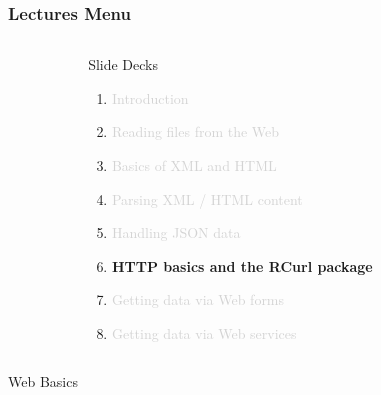 \documentclass{beamer}\usepackage[]{graphicx}\usepackage[]{color}
\begin{document}
\begin{frame}
\frametitle{Lectures Menu}

\begin{columns}[t]
\begin{column}{0.1\textwidth}
\end{column}
\begin{column}{0.8\textwidth}
 \begin{block}{Slide Decks}
  \begin{enumerate}
   \item \textcolor{lightgray}{Introduction}
   \item \textcolor{lightgray}{Reading files from the Web}
   \item \textcolor{lightgray}{Basics of XML and HTML}
   \item \textcolor{lightgray}{Parsing XML / HTML content}
   \item \textcolor{lightgray}{Handling JSON data}
   \item \textbf{HTTP basics and the RCurl package}
   \item \textcolor{lightgray}{Getting data via Web forms}
   \item \textcolor{lightgray}{Getting data via Web services}
  \end{enumerate}
 \end{block}
\end{column}
\begin{column}{0.1\textwidth}
\end{column}
\end{columns}

\end{frame}


\begin{frame}
 \begin{center}
  \Huge{\textcolor{mandarina}{Web Basics}}
 \end{center}
\end{frame}

\end{document}
